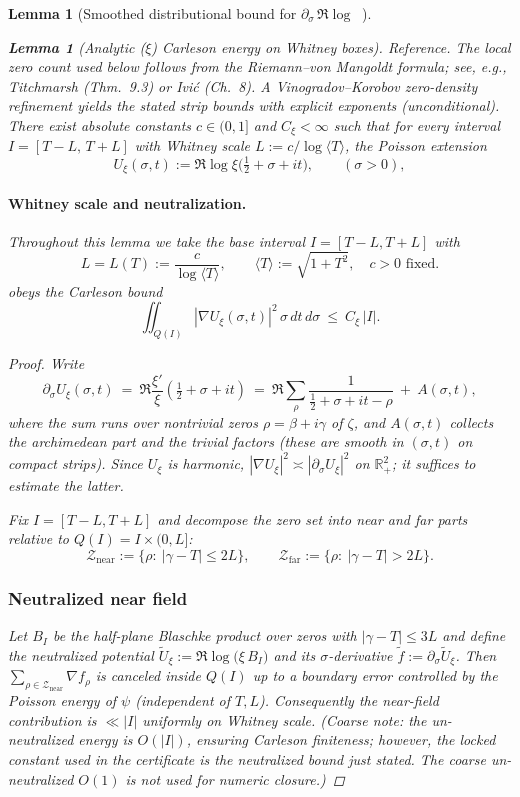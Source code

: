 \documentclass[11pt]{article}
\newtheorem{lemma}[theorem]{Lemma}
\theoremstyle{definition}
\theoremstyle{remark}
\newcommand{\R}{\mathbb{R}}
\DeclareMathOperator{\dettwo}{det_2}
\begin{document}
\begin{lemma}[Smoothed distributional bound for $\partial_\sigma\,\Re\log\dettwo$]
\begin{lemma}[Analytic ($\xi$) Carleson energy on Whitney boxes]\label{lem:carleson-xi}
\emph{Reference.} The local zero count used below follows from the Riemann--von Mangoldt formula; see, e.g., Titchmarsh (Thm.~9.3) or Ivi\'c (Ch.~8). A Vinogradov--Korobov zero-density refinement yields the stated strip bounds with explicit exponents (unconditional).
There exist absolute constants $c\in(0,1]$ and $C_\xi<\infty$ such that for every interval $I=[T-L,\,T+L]$ with Whitney scale $L:=c/\log\langle T\rangle$, the Poisson extension
\[
 U_{\xi}(\sigma,t):=\Re\log\xi\big(\tfrac12+\sigma+it\big),\qquad (\sigma>0),
\]
\paragraph{Whitney scale and neutralization.}
Throughout this lemma we take the base interval $I=[T-L,T+L]$ with
\[
  L=L(T):=\frac{c}{\log\langle T\rangle},\qquad \langle T\rangle:=\sqrt{1+T^2},\quad c>0\text{ fixed.}
\]
obeys the Carleson bound
\[ \iint_{Q(I)} |\nabla U_{\xi}(\sigma,t)|^2\,\sigma\,dt\,d\sigma\ \le\ C_\xi\,|I|. \]
\end{lemma}
\begin{proof}
Write
\[
 \partial_\sigma U_{\xi}(\sigma,t)\ =\ \Re\frac{\xi'}{\xi}\!\left(\tfrac12+\sigma+it\right)
 \ =\ \Re\sum_{\rho}\frac{1}{\tfrac12+\sigma+it-\rho}\ +\ A(\sigma,t),
\]
where the sum runs over nontrivial zeros $\rho=\beta+i\gamma$ of $\zeta$, and $A(\sigma,t)$ collects the archimedean part and the trivial factors (these are smooth in $(\sigma,t)$ on compact strips). Since $U_{\xi}$ is harmonic, $|\nabla U_{\xi}|^2\asymp |\partial_\sigma U_{\xi}|^2$ on $\R^2_+$; it suffices to estimate the latter.

Fix $I=[T-L,T+L]$ and decompose the zero set into near and far parts relative to $Q(I)=I\times(0,L]$:
\[
 \mathcal Z_{\mathrm{near}}:=\{\rho:\ |\gamma-T|\le 2L\},\qquad \mathcal Z_{\mathrm{far}}:=\{\rho:\ |\gamma-T|>2L\}.
\]
\subsubsection*{Neutralized near field}
Let $B_I$ be the half-plane Blaschke product over zeros with $|\gamma-T|\le 3L$ and define the neutralized potential $\widetilde U_\xi:=\Re\log\big(\xi\,B_I\big)$ and its $\sigma$-derivative $\widetilde f:=\partial_\sigma\widetilde U_\xi$. Then $\sum_{\rho\in \mathcal Z_{\mathrm{near}}}\nabla f_\rho$ is canceled inside $Q(I)$ up to a boundary error controlled by the Poisson energy of $\psi$ (independent of $T,L$). Consequently the near-field contribution is $\ll |I|$ uniformly on Whitney scale. (Coarse note: the un-neutralized energy is $O(|I|)$, ensuring Carleson finiteness; however, the locked constant used in the certificate is the neutralized bound just stated. The coarse un-neutralized $O(1)$ is not used for numeric closure.)


\end{proof}
\end{lemma}
\end{document}
